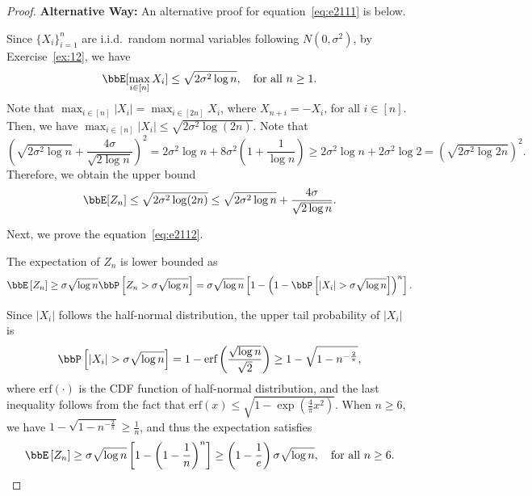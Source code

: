 \documentclass[11pt]{article}
\newcommand{\of}[1]{\left(#1\right)}
\newcommand{\off}[1]{\left[#1\right]}
\theoremstyle{plain}
\theoremstyle{definition}
\begin{document}
\begin{proof}
	 
	 \textbf{Alternative Way:} An alternative proof for equation~\eqref{eq:e2111} is below.
	 
	 Since $\{X_i\}_{i=1}^n$ are i.i.d.\ random normal variables following $N(0, \sigma^2)$, by Exercise~\ref{ex:12}, we have 
	 \begin{equation}
	 	\bbE[\max_{i \in [n]} X_i] \leq \sqrt{2 \sigma^2 \log n}, \quad \text{for all } n \geq 1.
	 \end{equation}
	 Note that $\max_{i \in [n]} |X_i| = \max_{i \in [2n]} X_i$, where $X_{n + i} = - X_i $, for all $i\in[n]$. Then, we have $\max_{i \in [n]}|X_i| \leq \sqrt{2 \sigma^2 \log(2n)}$. Note that
	 \begin{equation}
	 	 \of{\sqrt{2 \sigma^2 \log n} + \frac{4\sigma}{\sqrt{2 \log n}}}^2 = 2 \sigma^2 \log n + 8\sigma^2 \of{1 + \frac{1}{\log n}} \geq 2 \sigma^2 \log n + 2 \sigma^2 \log 2 = (\sqrt{2 \sigma^2 \log 2n} )^2.
 	 \end{equation}
 	 Therefore, we obtain the upper bound
 	 \begin{equation}
 	 	\bbE[Z_n] \leq \sqrt{2 \sigma^2 \log(2n)} \leq \sqrt{2 \sigma^2 \log n} + \frac{4\sigma}{\sqrt{2 \log n}}.
 	 \end{equation}
	 
	 
	 \vspace{0.2cm}
	 Next, we prove the equation~\eqref{eq:e2112}.
	 
	 \vspace{0.2cm}
	 
	 The expectation of $Z_n$ is lower bounded as
	 \begin{equation}
	 	\bbE \off{Z_n} \geq \sigma \sqrt{\log n} \bbP \off{Z_n > \sigma \sqrt{\log n}}  = \sigma \sqrt{\log n} \off{1 - \of{1 - \bbP \off{|X_i| > \sigma \sqrt{\log n}}   }^n}.
	 \end{equation}
	 
	 Since $|X_i|$ follows the half-normal distribution, the upper tail probability of $|X_i|$ is
	 \begin{equation}
	 	\bbP \off{ |X_i| > \sigma \sqrt{\log n}} = 1 - \text{erf}\of{\frac{\sqrt{\log n}}{\sqrt{2} } } \geq 1 - \sqrt{1 - n^{-\frac{2}{\pi}}},
	 \end{equation} 
	 where $\text{erf}(\cdot)$ is the CDF function of half-normal distribution, and the last inequality follows from the fact that $\text{erf}(x) \leq \sqrt{1 - \exp \of{\frac{4}{\pi} x^2 }}$. When $n \geq 6$, we have $1 - \sqrt{1 - n^{-\frac{2}{\pi}}} \geq \frac{1}{n}$, and thus the expectation satisfies
	 \begin{equation}
	 	\bbE \off{Z_n} \geq \sigma \sqrt{\log n} \off{1 - \of{1 - \frac{1}{n}   }^n} \geq \of{1 - \frac{1}{e}} \sigma \sqrt{\log n}, \quad \text{for all }n \geq 6.
	 \end{equation}
	 

\end{proof}
\end{document}
